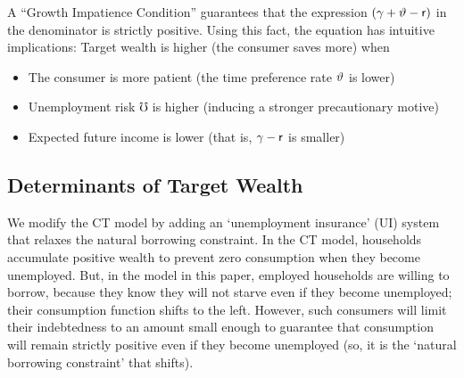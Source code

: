 \documentclass[titlepage]{\econtex}
\begin{document}
A ``Growth Impatience Condition'' guarantees that the expression $(\gamma+\vartheta-\mathsf{r})$ in the denominator is strictly positive.  Using this fact, the equation has intuitive implications:  Target wealth is higher (the consumer saves more) when
\begin{itemize}
\item The consumer is more patient  (the time preference rate $\vartheta$ is lower)
  \item Unemployment risk $\mho$ is higher (inducing a stronger precautionary motive)
\item Expected future income is lower (that is, $\gamma-\mathsf{r}$ is smaller)
  \end{itemize}


  \hypertarget{Determinants-of-Target-Wealth}{}

\subsection{Determinants of Target Wealth} \label{ssCfunction}


We modify the CT model by adding an `unemployment insurance' (UI) system that relaxes the natural borrowing constraint. In the CT model, households accumulate positive wealth to prevent zero consumption when they become unemployed. But, in the model in this paper, employed households are willing to borrow, because they know they will not starve even if they become unemployed; their consumption function shifts to the left. However, such consumers will limit their indebtedness to an amount small enough to guarantee that consumption will remain strictly positive even if they become unemployed (so, it is the `natural borrowing constraint' that shifts).%
 
\end{document}
